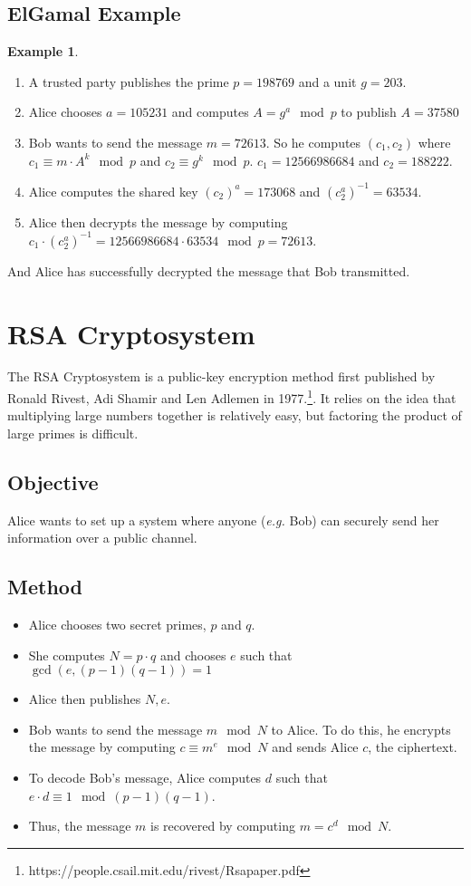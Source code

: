 \documentclass[10pt]{article}
\theoremstyle{definition}
\newtheorem{ex}[theorem]{Example}
\theoremstyle{remark}
\begin{document}
\subsection{ElGamal Example}
\begin{ex}
\begin{enumerate}
\item A trusted party publishes the prime $p=198769$ and a unit $g=203$.
\item Alice chooses $a=105231$ and computes $A=g^a\mod p$ to publish $A=37580$
\item Bob wants to send the message $m=72613$.  So he computes $(c_1,c_2)$ where $c_1 \equiv m \cdot A^k \mod p$ and $c_2 \equiv g^k \mod p$. $c_1 = 12566986684$ and $c_2 = 188222$.
\item Alice computes the shared key $(c_2)^a = 173068$ and $(c_{2}^a)^{-1} = 63534$.
\item Alice then decrypts the message by computing $c_1 \cdot (c_{2}^a)^{-1} = 12566986684 \cdot 63534 \mod p = 72613$.
\end{enumerate}
And Alice has successfully decrypted the message that Bob transmitted.
\end{ex}
\section{RSA Cryptosystem}
The RSA Cryptosystem is a public-key encryption method first published by Ronald Rivest, Adi Shamir and Len Adlemen in 1977.\footnote{https://people.csail.mit.edu/rivest/Rsapaper.pdf}.  It relies on the idea that multiplying large numbers together is relatively easy, but factoring the product of large primes is difficult.
\subsection{Objective}
Alice wants to set up a system where anyone (\textit{e.g.} Bob) can securely send her information over a public channel.
\subsection{Method}
\begin{itemize}
\item Alice chooses two secret primes, $p$ and $q$.
\item She computes $N=p\cdot q$ and chooses $e$ such that $\gcd(e, (p-1)(q-1)) = 1$
\item Alice then publishes $N, e$.
\item Bob wants to send the message $m \mod N$ to Alice.  To do this, he encrypts the message by computing $c \equiv m^e \mod N$ and sends Alice $c$, the ciphertext.
\item To decode Bob's message, Alice computes $d$ such that $e \cdot d \equiv 1 \mod (p-1)(q-1)$.
\item Thus, the message $m$ is recovered by computing $m = c^d \mod N$.
\end{itemize}
\end{document}
